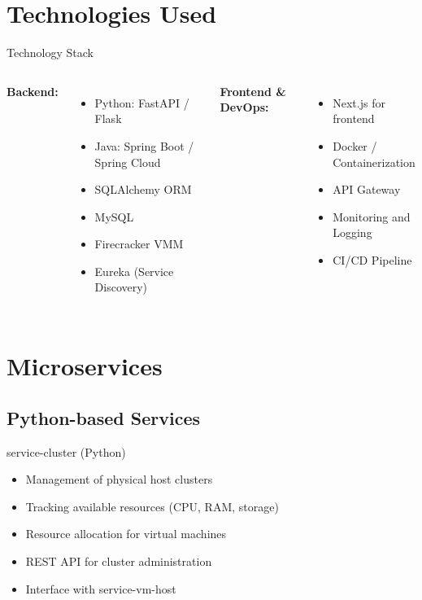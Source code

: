 \documentclass{beamer}
\begin{document}
\section{Technologies Used}

\begin{frame}{Technology Stack}
  \begin{columns}
    \textbf{Backend:}
    \begin{itemize}
      \item Python: FastAPI / Flask
      \item Java: Spring Boot / Spring Cloud
      \item SQLAlchemy ORM
      \item MySQL
      \item Firecracker VMM
      \item Eureka (Service Discovery)
    \end{itemize}
    
    \textbf{Frontend \& DevOps:}
    \begin{itemize}
      \item Next.js for frontend
      \item Docker / Containerization
      \item API Gateway
      \item Monitoring and Logging
      \item CI/CD Pipeline
    \end{itemize}
  \end{columns}
\end{frame}

\section{Microservices}

\subsection{Python-based Services}

\begin{frame}{service-cluster (Python)}
  \begin{itemize}
    \item Management of physical host clusters
    \item Tracking available resources (CPU, RAM, storage)
    \item Resource allocation for virtual machines
    \item REST API for cluster administration
    \item Interface with service-vm-host
  \end{itemize}
\end{frame}
\end{document}
